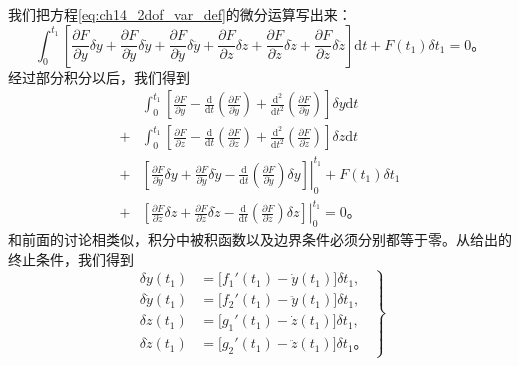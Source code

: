 我们把方程\eqref{eq:ch14_2dof_var_def}的微分运算写出来：
\begin{equation*}
\int_{0}^{t_1}\left[
\frac{\partial F}{\partial y}\delta y
+\frac{\partial F}{\partial \dot{y}}\delta\dot{y}
+\frac{\partial F}{\partial \ddot{y}}\delta\ddot{y}
+\frac{\partial F}{\partial z}\delta z
+\frac{\partial F}{\partial \dot{z}}\delta\dot{z}
+\frac{\partial F}{\partial \ddot{z}}\delta\ddot{z}
\right]\mathrm{d}t
+F(t_1)\delta t_1 = 0。
\end{equation*}
经过部分积分以后，我们得到
\begin{equation}
\begin{aligned}
&\int_{0}^{t_1}\left[
\frac{\partial F}{\partial y}
-\frac{\mathrm{d}}{\mathrm{d}t}\left(\frac{\partial F}{\partial \dot{y}}\right)
+\frac{\mathrm{d}^2}{\mathrm{d}t^2}\left(\frac{\partial F}{\partial \ddot{y}}\right)
\right]\delta y\mathrm{d}t \\
+&\int_{0}^{t_1}\left[
\frac{\partial F}{\partial z}
-\frac{\mathrm{d}}{\mathrm{d}t}\left(\frac{\partial F}{\partial \dot{z}}\right)
+\frac{\mathrm{d}^2}{\mathrm{d}t^2}\left(\frac{\partial F}{\partial \ddot{z}}\right)
\right]\delta z\mathrm{d}t \\
+&\left.\left[
\frac{\partial F}{\partial \dot{y}}\delta y
+\frac{\partial F}{\partial \ddot{y}}\delta\dot{y}
-\frac{\mathrm{d}}{\mathrm{d}t}\left(\frac{\partial F}{\partial \ddot{y}}\right)\delta y
\right]\right|_{0}^{t_1}
+F(t_1)\delta t_1 \\
+&\left.\left[
\frac{\partial F}{\partial \dot{z}}\delta z
+\frac{\partial F}{\partial \ddot{z}}\delta\dot{z}
-\frac{\mathrm{d}}{\mathrm{d}t}\left(\frac{\partial F}{\partial \ddot{z}}\right)\delta z
\right]\right|_{0}^{t_1}
= 0。
\end{aligned}
\label{eq:ch14_2dof_part_int}
\end{equation}
和前面的讨论相类似，积分中被积函数以及边界条件必须分别都等于零。从给出的终止条件，我们得到
\begin{equation}
\left.
\begin{aligned}
\delta y(t_1) &= \big[f_1'(t_1)-\dot{y}(t_1)\big]\delta t_1, \\
\delta\dot{y}(t_1) &= \big[f_2'(t_1)-\ddot{y}(t_1)\big]\delta t_1, \\
\delta z(t_1) &= \big[g_1'(t_1)-\dot{z}(t_1)\big]\delta t_1, \\
\delta\dot{z}(t_1) &= \big[g_2'(t_1)-\ddot{z}(t_1)\big]\delta t_1。
\end{aligned}
\right\}
\label{eq:ch14_2dof_end_cond}
\end{equation}
